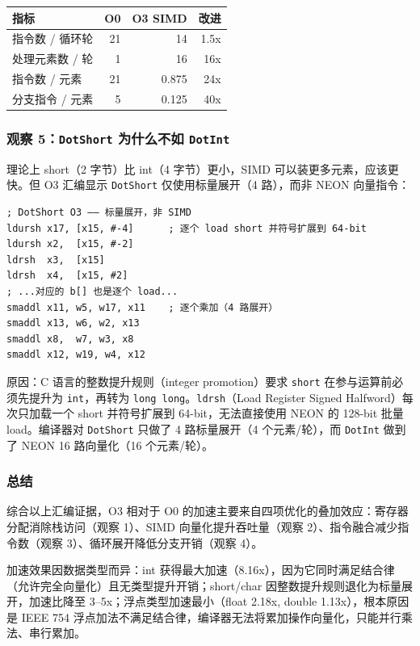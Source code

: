 \documentclass[12pt,a4paper]{article}
\begin{document}
\begin{table}[H]
\centering
\begin{tabular}{l r r r}
\toprule
指标 & O0 & O3 SIMD & 改进 \\
\midrule
指令数 / 循环轮 & 21 & 14 & 1.5x \\
处理元素数 / 轮 & 1 & 16 & 16x \\
指令数 / 元素 & 21 & 0.875 & 24x \\
分支指令 / 元素 & 5 & 0.125 & 40x \\
\bottomrule
\end{tabular}
\end{table}

\subsubsection{观察 5：\texttt{DotShort} 为什么不如 \texttt{DotInt}}

理论上 short（2 字节）比 int（4 字节）更小，SIMD 可以装更多元素，应该更快。但 O3 汇编显示 \texttt{DotShort} 仅使用标量展开（4 路），而非 NEON 向量指令：

\begin{lstlisting}
; DotShort O3 —— 标量展开，非 SIMD
ldursh x17, [x15, #-4]      ; 逐个 load short 并符号扩展到 64-bit
ldursh x2,  [x15, #-2]
ldrsh  x3,  [x15]
ldrsh  x4,  [x15, #2]
; ...对应的 b[] 也是逐个 load...
smaddl x11, w5, w17, x11    ; 逐个乘加（4 路展开）
smaddl x13, w6, w2, x13
smaddl x8,  w7, w3, x8
smaddl x12, w19, w4, x12
\end{lstlisting}

原因：C 语言的整数提升规则（integer promotion）要求 \texttt{short} 在参与运算前必须先提升为 \texttt{int}，再转为 \texttt{long long}。\texttt{ldrsh}（Load Register Signed Halfword）每次只加载一个 short 并符号扩展到 64-bit，无法直接使用 NEON 的 128-bit 批量 load。编译器对 \texttt{DotShort} 只做了 4 路标量展开（4 个元素/轮），而 \texttt{DotInt} 做到了 NEON 16 路向量化（16 个元素/轮）。

\subsubsection{总结}

综合以上汇编证据，O3 相对于 O0 的加速主要来自四项优化的叠加效应：寄存器分配消除栈访问（观察 1）、SIMD 向量化提升吞吐量（观察 2）、指令融合减少指令数（观察 3）、循环展开降低分支开销（观察 4）。

加速效果因数据类型而异：int 获得最大加速（8.16x），因为它同时满足结合律（允许完全向量化）且无类型提升开销；short/char 因整数提升规则退化为标量展开，加速比降至 3--5x；浮点类型加速最小（float 2.18x, double 1.13x），根本原因是 IEEE 754 浮点加法不满足结合律，编译器无法将累加操作向量化，只能并行乘法、串行累加。
\end{document}

